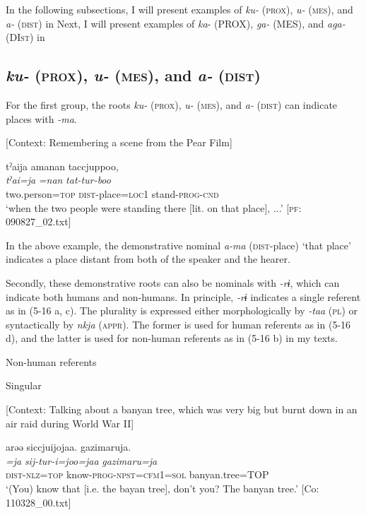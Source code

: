 In the following subsections, I will present examples of \textit{ku-} (\textsc{prox}), \textit{u-} (\textsc{mes}), and \textit{a-} (\textsc{dist}) in  Next, I will present examples of \textit{ka}{}- (PROX), \textit{ga-} (MES), and \textit{aga-} (DI\textsc{st}) in 

\subsection{\textit{ku-} (\textsc{prox}), \textit{u-} (\textsc{mes}), and \textit{a-} (\textsc{dist})}
\label{sec:key:5.2.1}
For the first group, the roots \textit{ku-} (\textsc{prox}), \textit{u-} (\textsc{mes}), and \textit{a-} (\textsc{dist}) can indicate places with \textit{{}-ma}.

\ea \label{ex:5:15}   [Context: Remembering a scene from the Pear Film]

\glll  tˀaija  amanan  taccjuppoo,\\
\textit{tˀai=ja}  \textit{=nan}  \textit{tat-tur-boo}\\
two.person=\textsc{top}  \textsc{dist}-place=\textsc{loc}1  stand-\textsc{prog}-\textsc{cnd}\\
\glt ‘when the two people were standing there [lit. on that place], ...’ [\textsc{pf}: 090827\_02.txt]
\z

\noindent In the above example, the demonstrative nominal \textit{a-ma} (\textsc{dist}-place) ‘that place’ indicates a place distant from both of the speaker and the hearer.

Secondly, these demonstrative roots can also be nominals with \textit{{}-rɨ}, which can indicate both humans and non-humans. In principle, \textit{{}-rɨ} indicates a single referent as in (5-16 a, c). The plurality is expressed either morphologically by \textit{{}-taa} (\textsc{pl}) or syntactically by \textit{nkja} (\textsc{appr}). The former is used for human referents as in (5-16 d), and the latter is used for non-human referents as in (5-16 b) in my texts.

\ea \label{ex:5:16}   Non-human referents

 \ea \label{ex:5:16a} Singular

    [Context: Talking about a banyan tree, which was very big but burnt down in an air raid during World War II]

\glll  arəə  siccjuijojaa.  gazimaruja.\\
\textit{=ja}  \textit{sij-tur-i=joo=jaa}  \textit{gazimaru=ja}\\
\textsc{dist}-\textsc{nlz}=\textsc{top}  know-\textsc{prog}-\textsc{npst}=\textsc{cfm}1=\textsc{sol}  banyan.tree=TOP\\
\glt ‘(You) know that [i.e. the bayan tree], don’t you? The banyan tree.’ [Co: 110328\_00.txt]

